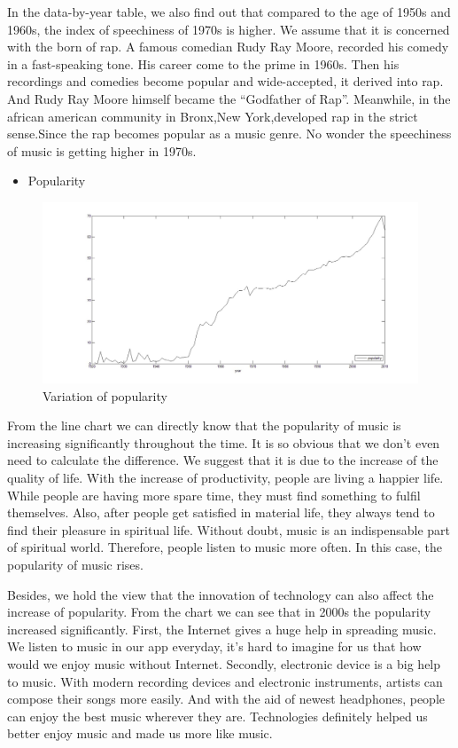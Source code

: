 \documentclass[12pt]{article}
\begin{document}
In the data-by-year table, we also find out that compared to the age of 1950s and 1960s, the index of speechiness
of 1970s is higher. We assume that it is concerned with the born of rap.  A famous comedian Rudy Ray Moore, recorded his
comedy in a fast-speaking tone.\cite{5} His career come to the prime 
in 1960s. Then his recordings and comedies become popular and wide-accepted, it derived into rap. And Rudy
Ray Moore himself became the ``Godfather of Rap''. Meanwhile, in the african american community in Bronx,New York,developed rap in the
 strict sense.Since the rap becomes popular as a music genre. No wonder the speechiness of music is getting higher in 1970s.
\begin{itemize}
\item Popularity
\end{itemize}\quad\;
\begin{figure}[h]
\centering
\includegraphics[width=12cm]{popular.png}
\caption{Variation of popularity}
\end{figure}

From the line chart we can directly know that the popularity of music is increasing significantly throughout the time.
It is so obvious that we don't even need to calculate the difference. We suggest that it is due to the increase of the quality 
of life. With the increase of productivity, people are living a happier life. While people are having more spare time, they must find something to fulfil themselves. 
Also, after people get satisfied in material life, they always tend to find their pleasure in spiritual life. Without doubt, music is an indispensable part
 of spiritual world. Therefore, people listen to music more often. In this case, the popularity of music rises. \par
Besides, we hold the view that the innovation of technology can also affect the increase of popularity. From the chart we can see that in 2000s the popularity  increased significantly. 
First, the Internet gives a huge help in spreading music. We listen to music in our app everyday, it's hard to imagine for us that how would we enjoy music without Internet. Secondly, 
electronic device is a big help to music. With modern recording devices and electronic instruments, artists can compose their songs more easily. And with the aid of newest headphones, people
can enjoy the best music wherever they are. Technologies definitely helped us better enjoy music and made us more like music.
\end{document}
